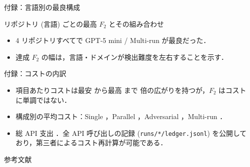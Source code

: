 \documentclass[10pt, aspectratio=169, t]{beamer}
\begin{document}
\begin{frame}{付録：言語別の最良構成}
    \begin{center}
        \small リポジトリ (言語) ごとの最高 $F_2$ とその組み合わせ\\[3pt]
        \footnotesize
        
    \end{center}

    \vspace{6pt}
    \begin{itemize}
        \item 4 リポジトリすべてで GPT-5 mini / Multi-run が最良だった．
        \item 達成 $F_2$ の幅は，言語・ドメインが検出難度を左右することを示す．
    \end{itemize}
\end{frame}

\begin{frame}{付録：コストの内訳}
    \begin{itemize}
        \item 項目あたりコストは最安 \cheapestCost{} から最高 \priciestCost{} まで \costSpread{} 倍の広がりを持つが，$F_2$ はコストに単調ではない．
        \item 構成別の平均コスト：Single \singleMeanCost{}，Parallel \parallelMeanCost{}，Adversarial \adversarialMeanCost{}，Multi-run \multiMeanCost{}．
        \item 総 API 支出 \totalSpend{}．全 API 呼び出しの記録 (\texttt{runs/*/ledger.jsonl}) を公開しており，第三者によるコスト再計算が可能である．
    \end{itemize}
\end{frame}

\begin{frame}[allowframebreaks]{参考文献}
    \printbibliography[heading=none]
\end{frame}
\end{document}
